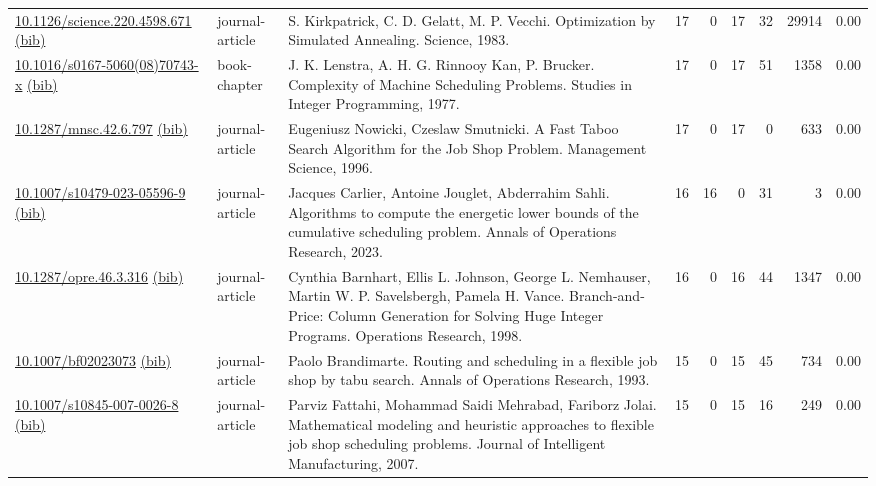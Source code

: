 {\begin{longtable}{p{5cm}lp{11cm}rrrrrr}
\href{http://dx.doi.org/10.1126/science.220.4598.671}{10.1126/science.220.4598.671} \href{https://www.doi2bib.org/bib/10.1126/science.220.4598.671}{(bib)} & journal-article & S. Kirkpatrick, C. D. Gelatt, M. P. Vecchi. Optimization by Simulated Annealing. Science, 1983. & 17 & 0 & 17 & 32 & 29914 &  0.00\\
\href{http://dx.doi.org/10.1016/s0167-5060(08)70743-x}{10.1016/s0167-5060(08)70743-x} \href{https://www.doi2bib.org/bib/10.1016/s0167-5060(08)70743-x}{(bib)} & book-chapter & J. K. Lenstra, A. H. G. Rinnooy Kan, P. Brucker. Complexity of Machine Scheduling Problems. Studies in Integer Programming, 1977. & 17 & 0 & 17 & 51 & 1358 &  0.00\\
\href{http://dx.doi.org/10.1287/mnsc.42.6.797}{10.1287/mnsc.42.6.797} \href{https://www.doi2bib.org/bib/10.1287/mnsc.42.6.797}{(bib)} & journal-article & Eugeniusz Nowicki, Czeslaw Smutnicki. A Fast Taboo Search Algorithm for the Job Shop Problem. Management Science, 1996. & 17 & 0 & 17 & 0 & 633 &  0.00\\
\href{http://dx.doi.org/10.1007/s10479-023-05596-9}{10.1007/s10479-023-05596-9} \href{https://www.doi2bib.org/bib/10.1007/s10479-023-05596-9}{(bib)} & journal-article & Jacques Carlier, Antoine Jouglet, Abderrahim Sahli. Algorithms to compute the energetic lower bounds of the cumulative scheduling problem. Annals of Operations Research, 2023. & 16 & 16 & 0 & 31 & 3 &  0.00\\
\href{http://dx.doi.org/10.1287/opre.46.3.316}{10.1287/opre.46.3.316} \href{https://www.doi2bib.org/bib/10.1287/opre.46.3.316}{(bib)} & journal-article & Cynthia Barnhart, Ellis L. Johnson, George L. Nemhauser, Martin W. P. Savelsbergh, Pamela H. Vance. Branch-and-Price: Column Generation for Solving Huge Integer Programs. Operations Research, 1998. & 16 & 0 & 16 & 44 & 1347 &  0.00\\
\href{http://dx.doi.org/10.1007/bf02023073}{10.1007/bf02023073} \href{https://www.doi2bib.org/bib/10.1007/bf02023073}{(bib)} & journal-article & Paolo Brandimarte. Routing and scheduling in a flexible job shop by tabu search. Annals of Operations Research, 1993. & 15 & 0 & 15 & 45 & 734 &  0.00\\
\href{http://dx.doi.org/10.1007/s10845-007-0026-8}{10.1007/s10845-007-0026-8} \href{https://www.doi2bib.org/bib/10.1007/s10845-007-0026-8}{(bib)} & journal-article & Parviz Fattahi, Mohammad Saidi Mehrabad, Fariborz Jolai. Mathematical modeling and heuristic approaches to flexible job shop scheduling problems. Journal of Intelligent Manufacturing, 2007. & 15 & 0 & 15 & 16 & 249 &  0.00\\

\end{longtable}}
